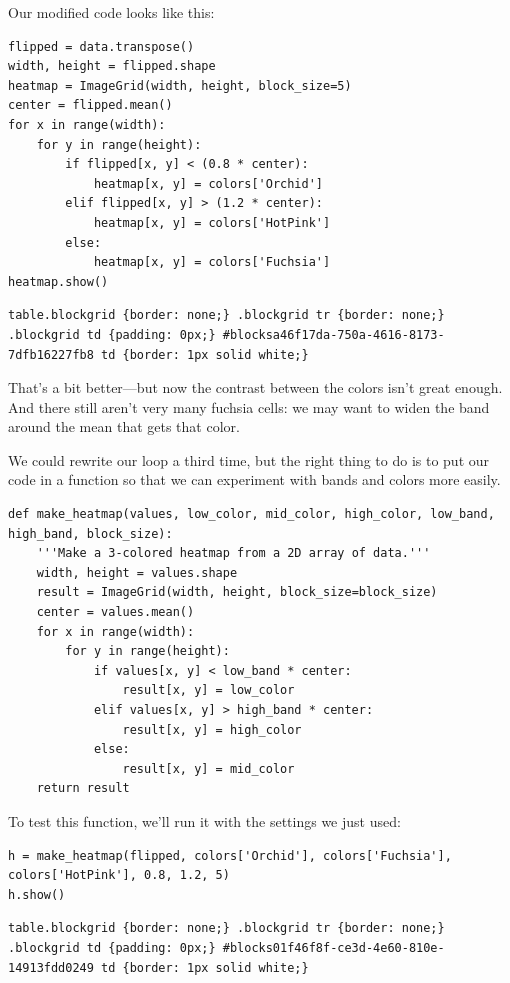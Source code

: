 \documentclass[]{book}
\begin{document}
Our modified code looks like this:

\begin{verbatim}
flipped = data.transpose()
width, height = flipped.shape
heatmap = ImageGrid(width, height, block_size=5)
center = flipped.mean()
for x in range(width):
    for y in range(height):
        if flipped[x, y] < (0.8 * center):
            heatmap[x, y] = colors['Orchid']
        elif flipped[x, y] > (1.2 * center):
            heatmap[x, y] = colors['HotPink']
        else:
            heatmap[x, y] = colors['Fuchsia']
heatmap.show()
\end{verbatim}

\begin{verbatim}
table.blockgrid {border: none;} .blockgrid tr {border: none;} .blockgrid td {padding: 0px;} #blocksa46f17da-750a-4616-8173-7dfb16227fb8 td {border: 1px solid white;}
\end{verbatim}

That's a bit better---but now the contrast between the colors isn't
great enough. And there still aren't very many fuchsia cells: we may
want to widen the band around the mean that gets that color.

We could rewrite our loop a third time, but the right thing to do is to
put our code in a function so that we can experiment with bands and
colors more easily.

\begin{verbatim}
def make_heatmap(values, low_color, mid_color, high_color, low_band, high_band, block_size):
    '''Make a 3-colored heatmap from a 2D array of data.'''
    width, height = values.shape
    result = ImageGrid(width, height, block_size=block_size)
    center = values.mean()
    for x in range(width):
        for y in range(height):
            if values[x, y] < low_band * center:
                result[x, y] = low_color
            elif values[x, y] > high_band * center:
                result[x, y] = high_color
            else:
                result[x, y] = mid_color
    return result
\end{verbatim}

To test this function, we'll run it with the settings we just used:

\begin{verbatim}
h = make_heatmap(flipped, colors['Orchid'], colors['Fuchsia'], colors['HotPink'], 0.8, 1.2, 5)
h.show()
\end{verbatim}

\begin{verbatim}
table.blockgrid {border: none;} .blockgrid tr {border: none;} .blockgrid td {padding: 0px;} #blocks01f46f8f-ce3d-4e60-810e-14913fdd0249 td {border: 1px solid white;}
\end{verbatim}
\end{document}

